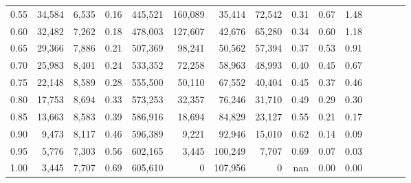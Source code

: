 \begin{tabular}{rrrcrrrrrrrrrrr}
0.55 &  34,584 &  6,535 &                                       0.16 &  445,521 &  160,089 &   35,414 &   72,542 &  0.31 &  0.67 &                         1.48 \\
0.60 &  32,482 &  7,262 &                                       0.18 &  478,003 &  127,607 &   42,676 &   65,280 &  0.34 &  0.60 &                         1.18 \\
0.65 &  29,366 &  7,886 &                                       0.21 &  507,369 &   98,241 &   50,562 &   57,394 &  0.37 &  0.53 &                         0.91 \\
0.70 &  25,983 &  8,401 &                                       0.24 &  533,352 &   72,258 &   58,963 &   48,993 &  0.40 &  0.45 &                         0.67 \\
0.75 &  22,148 &  8,589 &                                       0.28 &  555,500 &   50,110 &   67,552 &   40,404 &  0.45 &  0.37 &                         0.46 \\
0.80 &  17,753 &  8,694 &                                       0.33 &  573,253 &   32,357 &   76,246 &   31,710 &  0.49 &  0.29 &                         0.30 \\
0.85 &  13,663 &  8,583 &                                       0.39 &  586,916 &   18,694 &   84,829 &   23,127 &  0.55 &  0.21 &                         0.17 \\
0.90 &   9,473 &  8,117 &                                       0.46 &  596,389 &    9,221 &   92,946 &   15,010 &  0.62 &  0.14 &                         0.09 \\
0.95 &   5,776 &  7,303 &                                       0.56 &  602,165 &    3,445 &  100,249 &    7,707 &  0.69 &  0.07 &                         0.03 \\
1.00 &   3,445 &  7,707 &                                       0.69 &  605,610 &        0 &  107,956 &        0 &   nan &  0.00 &                         0.00 \\
\bottomrule
\end{tabular}
